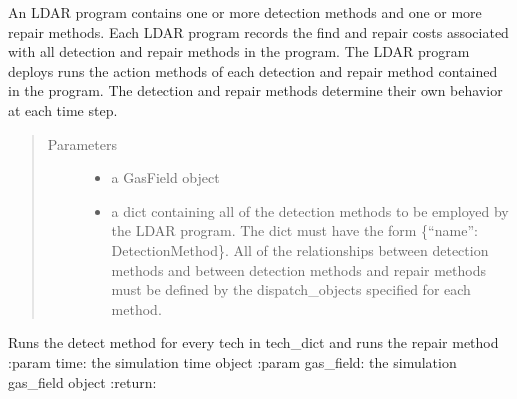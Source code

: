 \documentclass[letterpaper,10pt,english]{sphinxmanual}
\begin{document}
\begin{fulllineitems}
\label{\detokenize{index:feast.DetectionModules.ldar_program.LDARProgram}}
An LDAR program contains one or more detection methods and one or more repair methods. Each LDAR program records
the find and repair costs associated with all detection and repair methods in the program. The LDAR program
deploys runs the action methods of each detection and repair method contained in the program. The detection and
repair methods determine their own behavior at each time step.
\begin{quote}\begin{description}
\item[{Parameters}] \leavevmode\begin{itemize}
\item {} 
 \textendash{} a GasField object

\item {} 
 \textendash{} a dict containing all of the detection methods to be employed by the LDAR program. The dict
must have the form \{“name”: DetectionMethod\}. All of the relationships between detection methods and between
detection methods and repair methods must be defined by the dispatch\_objects specified for each method.

\end{itemize}

\end{description}\end{quote}

\begin{fulllineitems}
\label{\detokenize{index:feast.DetectionModules.ldar_program.LDARProgram.action}}
Runs the detect method for every tech in tech\_dict and runs the repair method
:param time: the simulation time object
:param gas\_field: the simulation gas\_field object
:return:

\end{fulllineitems}



\end{fulllineitems}
\end{document}
